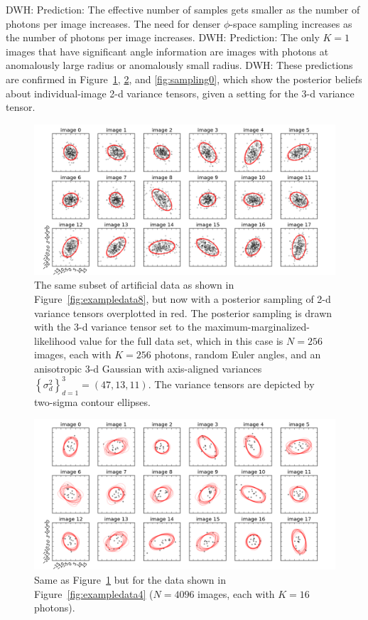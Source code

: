 \documentclass[12pt]{article}
\newcommand{\hoggcaption}[1]{\caption{\textsf{#1}}}
\renewcommand{\figurename}{\textsf{Figure}}
\newcommand{\setof}[1]{\left\{{#1}\right\}}
\begin{document}
DWH: Prediction: The effective number of samples gets smaller as the
number of photons per image increases.  The need for denser
$\phi$-space sampling increases as the number of photons per image
increases.
DWH: Prediction: The only $K=1$ images that have significant angle
information are images with photons at anomalously large radius or
anomalously small radius.
DWH: These predictions are confirmed in
\figurename~\ref{fig:sampling8}, \ref{fig:sampling4}, and \ref{fig:sampling0},
which show the posterior beliefs about individual-image 2-d variance
tensors, given a setting for the 3-d variance tensor.
\begin{figure}[!tbp]
\includegraphics[width=\textwidth]{sampling_08_08.png}
\hoggcaption{The same subset of artificial data as shown in
  \figurename~\ref{fig:exampledata8},
  but now with a posterior sampling of 2-d variance tensors overplotted in red.
  The posterior sampling is drawn with the 3-d variance tensor set to the
  maximum-marginalized-likelihood value for the full data set,
  which in this case is
  $N=256$ images, each with $K=256$ photons, random Euler angles, and
  an anisotropic 3-d Gaussian with axis-aligned variances
  $\setof{\sigma^2_d}_{d=1}^3 = (47, 13, 11)$.
  The variance tensors are depicted by two-sigma contour ellipses.\label{fig:sampling8}}
\end{figure}
\begin{figure}[!tbp]
\includegraphics[width=\textwidth]{sampling_12_04.png}
\hoggcaption{Same as \figurename~\ref{fig:sampling8} but for the data shown in
  \figurename~\ref{fig:exampledata4}
  ($N=4096$ images, each with $K=16$ photons).\label{fig:sampling4}}
\end{figure}
\end{document}
